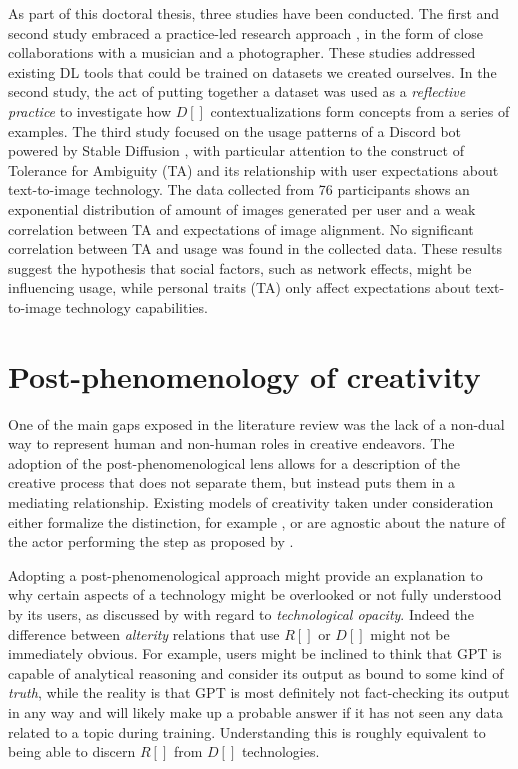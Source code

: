 As part of this doctoral thesis, three studies have been conducted. The first and second study embraced a practice-led research approach \citep{Candy2011}, in the form of close collaborations with a musician and a photographer. These studies addressed existing DL tools that could be trained on datasets we created ourselves. In the second study, the act of putting together a dataset was used as a \emph{reflective practice} \citep{Schoen1991} to investigate how $D[]$ contextualizations form concepts from a series of examples. The third study focused on the usage patterns of a Discord bot powered by Stable Diffusion \citep{Rombach2021}, with particular attention to the construct of Tolerance for Ambiguity (TA) \citep{Norton1975} and its relationship with user expectations about text-to-image technology. The data collected from 76 participants shows an exponential distribution of amount of images generated per user and a weak correlation between TA and expectations of image alignment. No significant correlation between TA and usage was found in the collected data. These results suggest the hypothesis that social factors, such as network effects, might be influencing usage, while personal traits (TA) only affect expectations about text-to-image technology capabilities.

\section{Post-phenomenology of creativity}

One of the main gaps exposed in the literature review was the lack of a non-dual way to represent human and non-human roles in creative endeavors. The adoption of the post-phenomenological lens allows for a description of the creative process that does not separate them, but instead puts them in a mediating relationship. Existing models of creativity taken under consideration either formalize the distinction, for example \cite{Rhodes1961}, or are agnostic about the nature of the actor performing the step as proposed by \cite{Hoorn2014}.

Adopting a post-phenomenological approach might provide an explanation to why certain aspects of a technology might be overlooked or not fully understood by its users, as discussed by \cite{Eede2010} with regard to \emph{technological opacity}. Indeed the difference between \emph{alterity} relations that use $R[]$ or $D[]$ might not be immediately obvious. For example, users might be inclined to think that GPT is capable of analytical reasoning and consider its output as bound to some kind of \emph{truth}, while the reality is that GPT is most definitely not fact-checking its output in any way and will likely make up a probable answer if it has not seen any data related to a topic during training. Understanding this is roughly equivalent to being able to discern $R[]$ from $D[]$ technologies.

